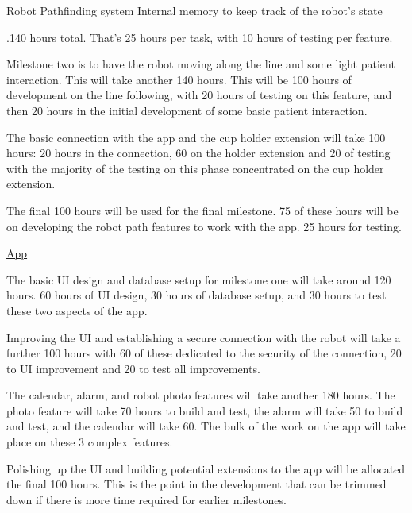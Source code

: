 \documentclass{article}
\begin{document}
Robot Pathfinding system
    Internal memory to keep track of the robot's state 
    
    

.140 hours total. That's 25 hours per task, with 10 hours of testing per feature.

Milestone two is to have the robot moving along the line and some light patient interaction. This will take another 140 hours. This will be 100 hours of development on the line following, with 20 hours of testing on this feature, and then 20 hours in the initial development of some basic patient interaction.

The basic connection with the app and the cup holder extension will take 100 hours: 20 hours in the connection, 60 on the holder extension and 20 of testing with the majority of the testing on this phase concentrated on the cup holder extension.

The final 100 hours will be used for the final milestone. 75 of these hours will be on developing the robot path features to work with the app. 25 hours for testing.

\underline{App}

The basic UI design and database setup for milestone one will take around 120 hours. 60 hours of UI design, 30 hours of database setup, and 30 hours to test these two aspects of the app.

Improving the UI and establishing a secure connection with the robot will take a further 100 hours with 60 of these dedicated to the security of the connection, 20 to UI improvement and 20 to test all improvements.

The calendar, alarm, and robot photo features will take another 180 hours. The photo feature will take 70 hours to build and test, the alarm will take 50 to build and test, and the calendar will take 60. The bulk of the work on the app will take place on these 3 complex features.

Polishing up the UI and building potential extensions to the app will be allocated the final 100 hours. This is the point in the development that can be trimmed down if there is more time required for earlier milestones.
\end{document}

